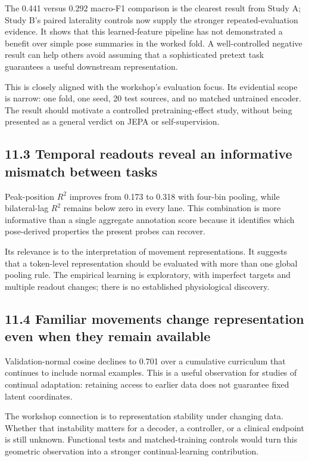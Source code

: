 \documentclass[11pt,letterpaper]{article}
\begin{document}
The 0.441 versus 0.292 macro-F1 comparison is the clearest result from
Study A; Study B's paired laterality controls now supply the stronger
repeated-evaluation evidence. It shows that this learned-feature
pipeline has not demonstrated a benefit over simple pose summaries in
the worked fold. A well-controlled negative result can help others avoid
assuming that a sophisticated pretext task guarantees a useful
downstream representation.

This is closely aligned with the workshop's evaluation focus. Its
evidential scope is narrow: one fold, one seed, 20 test sources, and no
matched untrained encoder. The result should motivate a controlled
pretraining-effect study, without being presented as a general verdict
on JEPA or self-supervision.

\subsection{11.3 Temporal readouts reveal an informative mismatch
between
tasks}\label{temporal-readouts-reveal-an-informative-mismatch-between-tasks}

Peak-position \(R^2\) improves from 0.173 to 0.318 with four-bin
pooling, while bilateral-lag \(R^2\) remains below zero in every lane.
This combination is more informative than a single aggregate annotation
score because it identifies which pose-derived properties the present
probes can recover.

Its relevance is to the interpretation of movement representations. It
suggests that a token-level representation should be evaluated with more
than one global pooling rule. The empirical learning is exploratory,
with imperfect targets and multiple readout changes; there is no
established physiological discovery.

\subsection{11.4 Familiar movements change representation even when they
remain
available}\label{familiar-movements-change-representation-even-when-they-remain-available}

Validation-normal cosine declines to 0.701 over a cumulative curriculum
that continues to include normal examples. This is a useful observation
for studies of continual adaptation: retaining access to earlier data
does not guarantee fixed latent coordinates.

The workshop connection is to representation stability under changing
data. Whether that instability matters for a decoder, a controller, or a
clinical endpoint is still unknown. Functional tests and
matched-training controls would turn this geometric observation into a
stronger continual-learning contribution.
\end{document}
